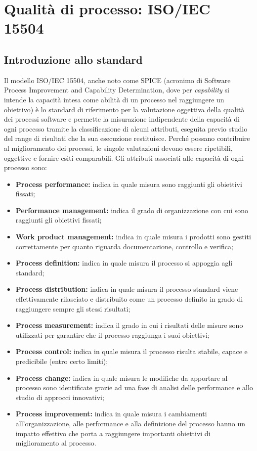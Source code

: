 \documentclass[openany,12pt,a4paper]{report}
\begin{document}

\section{Qualità di processo: ISO/IEC 15504}

\subsection{Introduzione allo standard}

Il modello ISO/IEC 15504, anche noto come SPICE (acronimo di Software Process Improvement and Capability Determination, dove per \textit{capability} si intende la capacità intesa come abilità di un processo nel raggiungere un obiettivo) è lo standard di riferimento per la valutazione oggettiva della qualità dei processi software e permette la misurazione indipendente della capacità di ogni processo tramite la classificazione di alcuni attributi, eseguita previo studio del range di risultati che la sua esecuzione restituisce. Perché possano contribuire al miglioramento dei processi, le singole valutazioni devono essere ripetibili, oggettive e fornire esiti comparabili. Gli attributi associati alle capacità di ogni processo sono:

\begin{itemize}
    \item \textbf{Process performance:} indica in quale misura sono raggiunti gli obiettivi fissati;
    \item \textbf{Performance management:} indica il grado di organizzazione con cui sono raggiunti gli obiettivi fissati;
    \item \textbf{Work product management:} indica in quale misura i prodotti sono gestiti correttamente per quanto riguarda documentazione, controllo e verifica;
    \item \textbf{Process definition:} indica in quale misura il processo si appoggia agli standard; 
    \item \textbf{Process distribution:} indica in quale misura il processo standard viene effettivamente rilasciato e distribuito come un processo definito in grado di raggiungere sempre gli stessi risultati;
    \item \textbf{Process measurement:} indica il grado in cui i risultati delle misure sono utilizzati per garantire che il processo raggiunga i suoi obiettivi;
    \item \textbf{Process control:} indica in quale misura il processo risulta stabile, capace e predicibile (entro certo limiti);
    \item \textbf{Process change:} indica in quale misura le modifiche da apportare al processo sono identificate grazie ad una fase di analisi delle performance e allo studio di approcci innovativi;
    \item \textbf{Process improvement:} indica in quale misura i cambiamenti all'organizzazione, alle performance e alla definizione del processo hanno un impatto effettivo che porta a raggiungere importanti obiettivi di miglioramento al processo.
\end{itemize}
\end{document}
